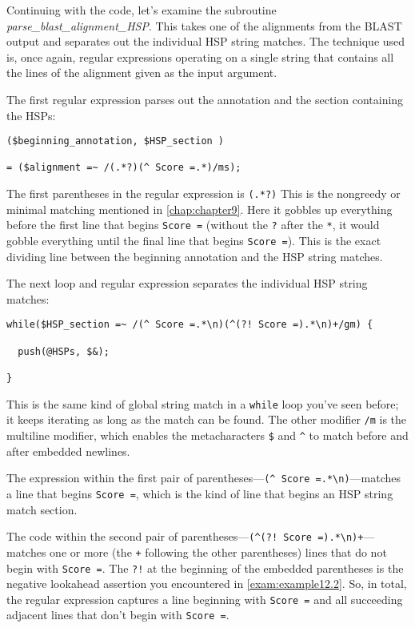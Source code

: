 Continuing with the code, let's examine the subroutine \textit{parse\_blast\_alignment\_HSP}. This takes one of the alignments from the BLAST output and separates out the individual HSP string matches. The technique used is, once again, regular expressions operating on a single string that contains all the lines of the alignment given as the input argument.

The first regular expression parses out the annotation and the section containing the HSPs: 

\begin{lstlisting}
($beginning_annotation, $HSP_section )

= ($alignment =~ /(.*?)(^ Score =.*)/ms);
\end{lstlisting}

The first parentheses in the regular expression is \verb|(.*?)| This is the nongreedy or minimal matching mentioned in \autoref{chap:chapter9}. Here it gobbles up everything before the first line that begins \verb|Score =| (without the \verb|?| after the \verb|*|, it would gobble everything until the final line that begins \verb|Score =|). This is the exact dividing line between the beginning annotation and the HSP string matches.

The next loop and regular expression separates the individual HSP string matches: 

\begin{lstlisting}
while($HSP_section =~ /(^ Score =.*\n)(^(?! Score =).*\n)+/gm) {
  
  push(@HSPs, $&);

}
\end{lstlisting}

This is the same kind of global string match in a \verb|while| loop you've seen
before; it keeps iterating as long as the match can be found. The other
modifier \verb|/m| is the multiline modifier, which enables the metacharacters
\verb|$| and \verb|^| to match before and after embedded newlines.

The expression within the first pair of parentheses—\verb|(^ Score =.*\n)|—matches a line that begins \verb|Score =|, which is the kind of line that begins an HSP string match section.

The code within the second pair of parentheses—\verb|(^(?! Score =).*\n)+|—matches one or more (the \verb|+| following the other parentheses) lines that do not begin with \verb|Score =|. The \verb|?!| at the beginning of the embedded parentheses is the negative lookahead assertion you encountered in \autoref{exam:example12.2}. So, in total, the regular expression captures a line beginning with \verb|Score =| and all succeeding adjacent lines that don't begin with \verb|Score =|. 

